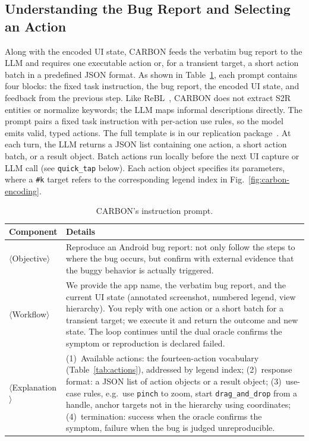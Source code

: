 \documentclass[10pt,conference,a4paper]{IEEEtran}
\begin{document}
\fi
  \subsection{Understanding the Bug Report and Selecting an Action}
  \label{sec:approach:actions}

   Along with the encoded UI state, CARBON feeds the verbatim bug report to the LLM and requires one executable action or, for a transient target, a short action batch in a predefined JSON format. As shown in Table~\ref{tab:instructions}, each prompt contains four blocks: the fixed task instruction, the bug report, the encoded UI state, and feedback from the previous step. Like ReBL~\cite{rebl}, CARBON does not extract S2R entities or normalize keywords; the LLM maps informal descriptions directly. The prompt pairs a fixed task instruction with per-action use rules, so the model emits valid, typed actions. The full template is in our replication package~\cite{carbon}. At each turn, the LLM returns a JSON list containing one action, a short action batch, or a result object. Batch actions run locally before the next UI capture or LLM call (see \texttt{quick\_tap} below). Each action object specifies its parameters, where a \texttt{\#k} target refers to the corresponding legend index in Fig.~\ref{fig:carbon-encoding}.



  \begin{table}[t]
  \caption{CARBON's instruction prompt.}
  \label{tab:instructions}
  \centering
  \footnotesize
  \renewcommand{\arraystretch}{1.3}
  \begin{tabular}{@{}p{}p{}@{}}
  \toprule
  \textbf{Component} & \textbf{Details} \\
  \midrule
  $\langle$Objective$\rangle$ &
  Reproduce an Android bug report: not only follow the steps to where the
  bug occurs, but confirm with external evidence that the buggy behavior
  is actually triggered. \\
  $\langle$Workflow$\rangle$ &
  We provide the app name, the verbatim bug report, and the current UI
  state (annotated screenshot, numbered legend, view hierarchy). You
  reply with one action or a short batch for a transient target; we
  execute it and return the outcome and new state. The loop continues
  until the dual oracle confirms the symptom or reproduction is declared
  failed. \\
  $\langle$Explanation$\rangle$ &
  (1)~Available actions: the fourteen-action vocabulary
  (Table~\ref{tab:actions}), addressed by legend index;
  (2)~response format: a JSON list of action objects or a result object;
  (3)~use-case rules, e.g.\ use \texttt{pinch} to zoom, start
  \texttt{drag\_and\_drop} from a handle, anchor targets not in the
  hierarchy using coordinates; (4)~termination: success when the oracle confirms the symptom, failure
  when the bug is judged unreproducible. \\
  \bottomrule
  \end{tabular}
  \end{table}
\end{document}
